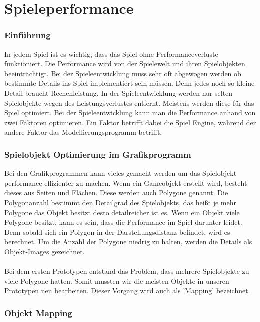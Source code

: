 
\pagebreak
{}
\chapter{Spieleperformance}



\subsection{Einführung}
In jedem Spiel ist es wichtig, dass das Spiel ohne Performanceverluste funktioniert. Die Performance wird von der Spielewelt und ihren Spielobjekten beeinträchtigt. Bei der Spieleentwicklung muss sehr oft abgewogen werden ob bestimmte Details ins Spiel implementiert sein müssen. Denn jedes noch so kleine Detail braucht Rechenleistung. In der Spieleentwicklung werden nur selten Spielobjekte wegen des Leistungsverlustes entfernt. Meistens werden diese für das Spiel optimiert. Bei der Spieleentwicklung kann man die Performance anhand von zwei Faktoren optimieren. Ein Faktor betrifft dabei die Spiel Engine, während der andere Faktor das Modellierungsprogramm betrifft. 

\subsection{Spielobjekt Optimierung im Grafikprogramm}
Bei den Grafikprogrammen kann vieles gemacht werden um das Spielobjekt performance effizienter zu machen. Wenn ein Gameobjekt erstellt wird, besteht dieses aus Seiten und Flächen. Diese werden auch Polygone genannt. Die Polygonanzahl bestimmt den Detailgrad des Spielobjekts, das heißt je mehr Polygone das Objekt besitzt desto detailreicher ist es. Wenn ein Objekt viele Polygone besitzt, kann es sein, dass die Performance im Spiel darunter leidet. Denn sobald sich ein Polygon in der Darstellungsdistanz befindet, wird es berechnet. Um die Anzahl der Polygone niedrig zu halten, werden die Details als \glqq Objekt-Images \grqq \space gezeichnet. \\\\ 
Bei dem ersten Prototypen entstand das Problem, dass mehrere Spielobjekte zu viele Polygone hatten. Somit mussten wir die meisten Objekte in unseren Prototypen neu bearbeiten. Dieser Vorgang wird auch als 'Mapping' bezeichnet.
\pagebreak
\subsection{Objekt Mapping}

